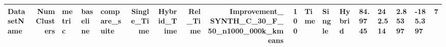 \begin{tabular}{lrlllrrrrr}
\toprule
DatasetName & NumClusters & metric & baseline & compare_suite & Single_Time & Hybrid_Time & Rel_Time & Improvement_%
\midrule
SYNTH_C_30_F_50_n1000_000k_kmeans & 100 & Time & Single & Hybrid & 84.9745 & 242.514 & 2.85397 & -185.397 & 7 \\
\bottomrule
\end{tabular}
